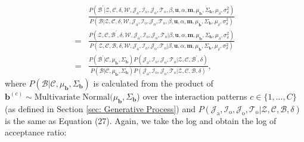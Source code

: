 \documentclass[a4paper]{article}
\begin{document}
 \begin{equation}
 \begin{aligned}
& \frac{P(\mathcal{B}^\prime|\mathcal{Z},   \mathcal{C},  \delta, \mathcal{W}, \mathcal{J}_{\mbox{a}}, \mathcal{I}_{\mbox{o}}, \mathcal{J}_{\mbox{o}}, \mathcal{T}_{\mbox{o}}, \beta, \boldsymbol{u}, \alpha, \boldsymbol{m}, \mu_{\boldsymbol{b}}, \Sigma_{\boldsymbol{b}}, \mu_\delta, \sigma^2_\delta)}{P(\mathcal{B}|\mathcal{Z},   \mathcal{C}, \delta, \mathcal{W}, \mathcal{J}_{\mbox{a}},\mathcal{I}_{\mbox{o}}, \mathcal{J}_{\mbox{o}}, \mathcal{T}_{\mbox{o}}, \beta, \boldsymbol{u}, \alpha, \boldsymbol{m}, \mu_{\boldsymbol{b}}, \Sigma_{\boldsymbol{b}}, \mu_\delta, \sigma^2_\delta)}\\=&\frac{P(\mathcal{Z}, \mathcal{C}, \mathcal{B}^\prime, \delta, \mathcal{W},  \mathcal{J}_{\mbox{a}}, \mathcal{I}_{\mbox{o}}, \mathcal{J}_{\mbox{o}}, \mathcal{T}_{\mbox{o}} |\beta, \boldsymbol{u}, \alpha, \boldsymbol{m}, \mu_{\boldsymbol{b}}, \Sigma_{\boldsymbol{b}}, \mu_\delta, \sigma^2_\delta)}{P(\mathcal{Z}, \mathcal{C}, \mathcal{B}, \delta, \mathcal{W}, \mathcal{J}_{\mbox{a}}, \mathcal{I}_{\mbox{o}}, \mathcal{J}_{\mbox{o}}, \mathcal{T}_{\mbox{o}} |\beta, \boldsymbol{u}, \alpha, \boldsymbol{m}, \mu_{\boldsymbol{b}}, \Sigma_{\boldsymbol{b}}, \mu_\delta, \sigma^2_\delta)}\\=&\frac{P(\mathcal{B}^\prime|\mathcal{C}, \mu_{\boldsymbol{b}}, \Sigma_{\boldsymbol{b}})P(\mathcal{J}_{\mbox{a}}, \mathcal{I}_{\mbox{o}}, \mathcal{J}_{\mbox{o}}, \mathcal{T}_{\mbox{o}} |\mathcal{Z}, \mathcal{C}, \mathcal{B}^\prime, \delta)}{P(\mathcal{B}|\mathcal{C}, \mu_{\boldsymbol{b}}, \Sigma_{\boldsymbol{b}})P(\mathcal{J}_{\mbox{a}}, \mathcal{I}_{\mbox{o}}, \mathcal{J}_{\mbox{o}}, \mathcal{T}_{\mbox{o}} |\mathcal{Z}, \mathcal{C}, \mathcal{B}, \delta)},
 \end{aligned}
 \end{equation}
 where $P(\mathcal{B}|\mathcal{C}, \mu_{\boldsymbol{b}}, \Sigma_{\boldsymbol{b}})$ is calculated from the product of $\boldsymbol{b}^{(c)}\sim \mbox{Multivariate Normal}(\mu_{\boldsymbol{b}}, \Sigma_{\boldsymbol{b}}$) over the interaction patterns $c \in \{1,...,C\}$ (as defined in Section \ref{sec: Generative Process}) and $P(\mathcal{J}_{\mbox{a}}, \mathcal{I}_{\mbox{o}}, \mathcal{J}_{\mbox{o}}, \mathcal{T}_{\mbox{o}} |\mathcal{Z}, \mathcal{C}, \mathcal{B}, \delta)$ is the same as Equation (27). Again, we take the log and obtain the log of acceptance ratio:
\end{document}
